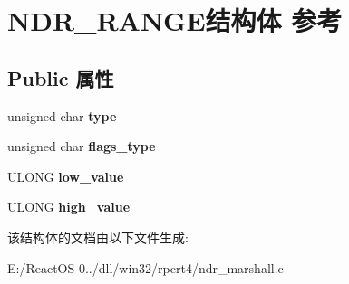 \hypertarget{struct_n_d_r___r_a_n_g_e}{}\section{N\+D\+R\+\_\+\+R\+A\+N\+G\+E结构体 参考}
\label{struct_n_d_r___r_a_n_g_e}
\subsection*{Public 属性}
\begin{DoxyCompactItemize}
\item 
\mbox{\label{struct_n_d_r___r_a_n_g_e_a9b92d4f1328fe5b616993ccd510a9357}} 
unsigned char {\bfseries type}
\item 
\mbox{\label{struct_n_d_r___r_a_n_g_e_abd8d762ce3acebb85193220c8494f009}} 
unsigned char {\bfseries flags\+\_\+type}
\item 
\mbox{\label{struct_n_d_r___r_a_n_g_e_a7d498d4b6f9ba2d3be3203c2d5dc37a5}} 
U\+L\+O\+NG {\bfseries low\+\_\+value}
\item 
\mbox{\label{struct_n_d_r___r_a_n_g_e_ab0e74e1e768c3cdb1dad141c44b33dbb}} 
U\+L\+O\+NG {\bfseries high\+\_\+value}
\end{DoxyCompactItemize}


该结构体的文档由以下文件生成\+:\begin{DoxyCompactItemize}
\item 
E\+:/\+React\+O\+S-\/0../dll/win32/rpcrt4/ndr\+\_\+marshall.\+c\end{DoxyCompactItemize}
